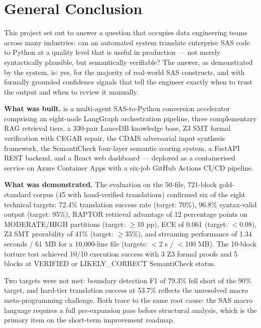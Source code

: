 
\chapter*{General Conclusion}
\thispagestyle{fancy}

This project set out to answer a question that occupies data engineering teams
across many industries: can an automated system translate enterprise SAS code to
Python at a quality level that is useful in production --- not merely syntactically
plausible, but semantically verifiable? The answer, as demonstrated by the
\codara{} system, is: yes, for the majority of real-world SAS constructs, and
with formally grounded confidence signals that tell the engineer exactly when to
trust the output and when to review it manually.

\textbf{What was built.} \codara{} is a multi-agent SAS-to-Python conversion
accelerator comprising an eight-node LangGraph orchestration pipeline, three
complementary RAG retrieval tiers, a 330-pair LanceDB knowledge base, Z3 SMT
formal verification with CEGAR repair, the CDAIS adversarial input synthesis
framework, the SemantiCheck four-layer semantic scoring system, a FastAPI
REST backend, and a React web dashboard --- deployed as a containerised service
on Azure Container Apps with a six-job GitHub Actions CI/CD pipeline.

\textbf{What was demonstrated.} The evaluation on the 50-file, 721-block
gold-standard corpus (45 with hand-verified translations) confirmed six of the
eight technical targets: 72.4\% translation success rate (target: 70\%),
96.8\% syntax-valid output (target: 95\%), RAPTOR retrieval advantage of 12
percentage points on MODERATE/HIGH partitions (target: $\geq$10 pp), ECE of
0.061 (target: $<$0.08), Z3 SMT provability of 41\% (target: $\geq$35\%), and
streaming performance of 1.34 seconds / 61 MB for a 10,000-line file
(targets: $<$2 s / $<$100 MB). The 10-block torture test achieved 10/10
execution success with 3 Z3 formal proofs and 5 blocks at VERIFIED or
LIKELY\_CORRECT SemantiCheck status.

Two targets were not met: boundary detection F1 of 79.3\% fell short of the
90\% target, and hard-tier translation success at 53.7\% reflects the
unresolved macro meta-programming challenge. Both trace to the same root cause:
the SAS macro language requires a full pre-expansion pass before structural
analysis, which is the primary item on the short-term improvement roadmap.

